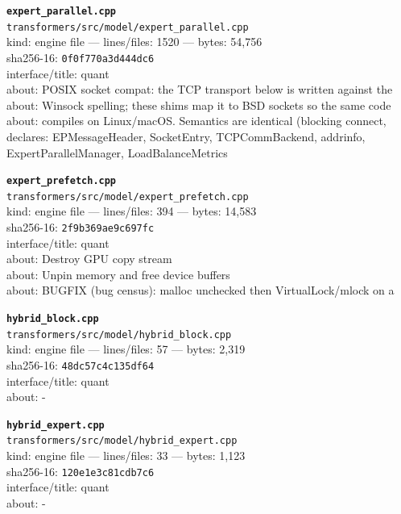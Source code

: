 \noindent\textbf{\texttt{expert\_parallel.cpp}}\\
\texttt{transformers/src/model/expert\_parallel.cpp}\\
kind: engine file --- lines/files: 1520 --- bytes: 54,756\\
sha256-16: \texttt{0f0f770a3d444dc6}\\
interface/title: quant\\
about: POSIX socket compat: the TCP transport below is written against the\\
about: Winsock spelling; these shims map it to BSD sockets so the same code\\
about: compiles on Linux/macOS. Semantics are identical (blocking connect,\\
declares: EPMessageHeader, SocketEntry, TCPCommBackend, addrinfo, ExpertParallelManager, LoadBalanceMetrics\\
\vspace*{6.0pt}
\newpage

\noindent\textbf{\texttt{expert\_prefetch.cpp}}\\
\texttt{transformers/src/model/expert\_prefetch.cpp}\\
kind: engine file --- lines/files: 394 --- bytes: 14,583\\
sha256-16: \texttt{2f9b369ae9c697fc}\\
interface/title: quant\\
about: Destroy GPU copy stream\\
about: Unpin memory and free device buffers\\
about: BUGFIX (bug census): malloc unchecked then VirtualLock/mlock on a\\
\vspace*{6.0pt}

\noindent\textbf{\texttt{hybrid\_block.cpp}}\\
\texttt{transformers/src/model/hybrid\_block.cpp}\\
kind: engine file --- lines/files: 57 --- bytes: 2,319\\
sha256-16: \texttt{48dc57c4c135df64}\\
interface/title: quant\\
about: -\\
\vspace*{6.0pt}

\noindent\textbf{\texttt{hybrid\_expert.cpp}}\\
\texttt{transformers/src/model/hybrid\_expert.cpp}\\
kind: engine file --- lines/files: 33 --- bytes: 1,123\\
sha256-16: \texttt{120e1e3c81cdb7c6}\\
interface/title: quant\\
about: -\\
\vspace*{6.0pt}


